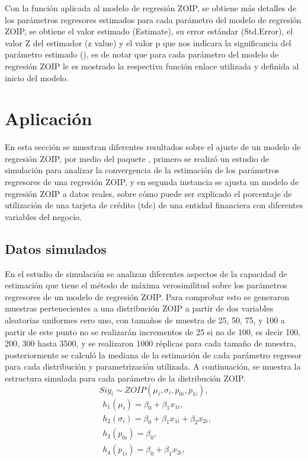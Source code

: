 Con la funci\'{o}n  aplicada al modelo de regresi\'{o}n ZOIP, se obtiene m\'{a}s detalles de los par\'{a}metros regresores estimados para cada par\'{a}metro del modelo de regresi\'{o}n ZOIP, se obtiene el valor estimado (Estimate), su error est\'{a}ndar (Std.Error), el valor Z del estimador (z value) y el valor p que nos indicara la significancia del par\'{a}metro estimado (), es de notar que para cada par\'{a}metro del modelo de regresi\'{o}n ZOIP le es mostrado la respectiva funci\'{o}n enlace utilizada y definida al inicio del modelo.


\section{Aplicaci\'{o}n}
En esta secci\'{o}n se muestran diferentes resultados sobre el ajuste de un modelo de regresi\'{o}n ZOIP, por medio del paquete , primero se realiz\'{o} un estudio de simulaci\'{o}n para analizar la convergencia de la estimaci\'{o}n de los par\'{a}metros regresores de una regresi\'{o}n ZOIP, y en segunda instancia se ajusta un modelo de regresi\'{o}n ZOIP a datos reales, sobre c\'{o}mo puede ser explicado el porcentaje de utilizaci\'{o}n de una tarjeta de cr\'{e}dito (tdc) de una entidad financiera con diferentes variables del negocio.

\subsection{Datos simulados}
En el estudio de simulaci\'{o}n se analizan diferentes aspectos de la capacidad de estimaci\'{o}n que tiene el m\'{e}todo de m\'{a}xima verosimilitud sobre los par\'{a}metros regresores de un modelo de regresi\'{o}n ZOIP. Para comprobar esto se generaron muestras pertenecientes a una distribuci\'{o}n ZOIP a partir de dos variables aleatorias uniformes cero uno, con tama\~{n}os de muestra de 25, 50, 75, y 100 a partir de este punto no se realizar\'{a}n incrementos de 25 si no de 100, es decir 100, 200, 300 hasta 3500, y se realizaron 1000 r\'{e}plicas para cada tama\~{n}o de muestra, posteriormente se calcul\'{o} la mediana de la estimaci\'{o}n de cada par\'{a}metro regresor para cada distribuci\'{o}n y parametrizaci\'{o}n utilizada. A continuaci\'{o}n, se muestra la estructura simulada para cada par\'{a}metro de la distribuci\'{o}n ZOIP.\\
\[
Si y_{i} \sim ZOIP(\mu_{i},\sigma_{i},p_{0i}, p_{1i}),
\]
\begin{equation}
\begin{split}
&h_1(\mu_{i})=\beta_0+\beta_1x_{1i},\\
&h_2(\sigma_{i})=\beta_0+\beta_1x_{1i}+\beta_2x_{2i},\\
&h_3(p_{0i})=\beta_0,\\
&h_4(p_{1i}) =\beta_0+\beta_1x_{2i},
\end{split}
\label{S_eq_reg}
\end{equation}

